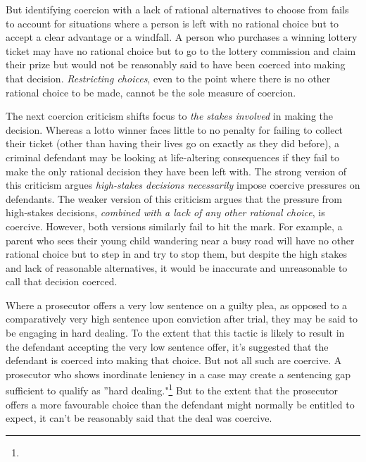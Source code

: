But identifying coercion with a lack of rational alternatives to choose from fails to account for situations where a person is left with no rational choice but to accept a clear advantage or a windfall. A person who purchases a winning lottery ticket may have no rational choice but to go to the lottery commission and claim their prize but would not be reasonably said to have been coerced into making that decision. \textit{Restricting choices}, even to the point where there is no other rational choice to be made, cannot be the sole measure of coercion.

The next coercion criticism shifts focus to \textit{the stakes involved} in making the decision. Whereas a lotto winner faces little to no penalty for failing to collect their ticket (other than having their lives go on exactly as they did before), a criminal defendant may be looking at life-altering consequences if they fail to make the only rational decision they have been left with. The strong version of this criticism argues \textit{high-stakes decisions necessarily} impose coercive pressures on defendants. The weaker version of this criticism argues that the pressure from high-stakes decisions, \textit{combined with a lack of any other rational choice}, is coercive. However, both versions similarly fail to hit the mark. For example, a parent who sees their young child wandering near a busy road will have no other rational choice but to step in and try to stop them, but despite the high stakes and lack of reasonable alternatives, it would be inaccurate and unreasonable to call that decision coerced. 

Where a prosecutor offers a very low sentence on a guilty plea, as opposed to a comparatively very high sentence upon conviction after trial, they may be said to be engaging in hard dealing. To the extent that this tactic is likely to result in the defendant accepting the very low sentence offer, it's suggested that the defendant is coerced into making that choice. But not all such are coercive. A prosecutor who shows inordinate leniency in a case may create a sentencing gap sufficient to qualify as ''hard dealing."\footnote{} But to the extent that the prosecutor offers a more favourable choice than the defendant might normally be entitled to expect, it can't be reasonably said that the deal was coercive.


